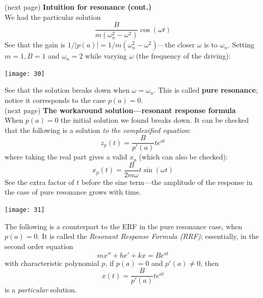 \documentclass{report}
\begin{document}
(next page)
\newpage
\noindent\textbf{Intuition for resonance (cont.)}\\
We had the particular solution
\begin{equation*}
\frac{B}{m(\omega_n^2-\omega^2)}\cos(\omega t)
\end{equation*}
See that the gain is $1/|p(a)|=1/m(\omega_n^2-\omega^2)$---the closer $\omega$ is to $\omega_n$. 
Setting $m=1,B=1$ and $\omega_n=2$ while varying $\omega$ (the frequency of the driving):
\begin{center}
\texttt{[image: 30]}\\
\end{center}
See that the solution breaks down when $\omega=\omega_n$. This is called \textbf{pure resonance}; notice it corresponds to the case $p(a)=0$.\\
(next page)
\newpage
\noindent\textbf{The workaround solution---resonant response formula}\\
When $p(a)=0$ the initial solution we found breaks down. It can be checked that the following is a solution 
\textit{to the complexified equation}:
\begin{equation*}
z_p(t)=\frac{B}{p'(a)}te^{at}
\end{equation*}
where taking the real part gives a valid $x_p$ (which can also be checked):
\begin{equation*}
x_p(t)=\frac{B}{2m\omega}t\sin(\omega t)
\end{equation*}
See the extra factor of $t$ before the sine term---the amplitude of the response in the case of pure resonance
grows with time. 
\begin{center}
\texttt{[image: 31]}\\
\end{center}
The following is a counterpart to the ERF in the pure resonance case, when $p(a)=0$. It is called the 
\textit{Resonant Response Formula (RRF)}; essentially, in the second order equation
\begin{equation*}
mx''+bx'+kx=Be^{at}
\end{equation*}
with characteristic polynomial $p$, if $p(a)=0$ and $p'(a)\neq0$, then 
\begin{equation*}
x(t)=\frac{B}{p'(a)}te^{at}
\end{equation*}
is a \textit{particular} solution.
\newpage
\end{document}
